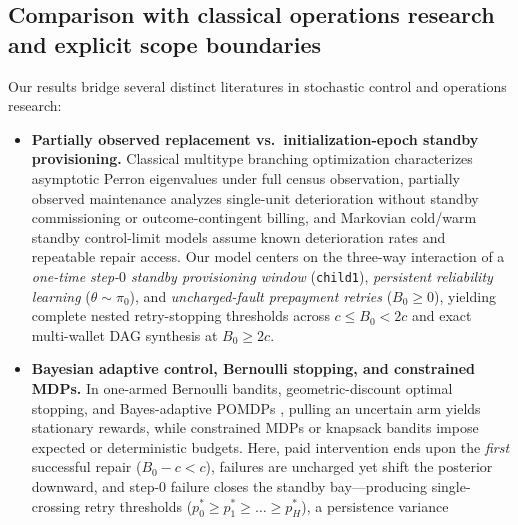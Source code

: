 \documentclass[11pt,letterpaper]{article}
\providecommand{\tightlist}{\setlength{\itemsep}{2pt}\setlength{\parskip}{0pt}}
\begin{document}
\subsection{Comparison with classical operations research and explicit
scope
boundaries}\label{comparison-with-classical-operations-research-and-explicit-scope-boundaries}

Our results bridge several distinct literatures in stochastic control
and operations research:

\begin{itemize}
\tightlist
\item
  \textbf{Partially observed replacement vs.~initialization-epoch
  standby provisioning.} Classical multitype branching optimization
  \citep{harris1963, sevastyanov1971, athreyaNey1972, pliska1976, rothblumWhittle1982, gonzalez2018}
  characterizes asymptotic Perron eigenvalues under full census
  observation, partially observed maintenance
  \citep{eckles1968, ross1971, barlowProschan1975, white1979, monahan1982, makisJiang2003}
  analyzes single-unit deterioration without standby commissioning or
  outcome-contingent billing, and Markovian cold/warm standby
  control-limit models \citep{barronYechiali2017} assume known
  deterioration rates and repeatable repair access. Our model centers on
  the three-way interaction of a \emph{one-time step-\(0\) standby
  provisioning window} (\texttt{child1}), \emph{persistent reliability
  learning} (\(\theta \sim \pi_0\)), and \emph{uncharged-fault
  prepayment retries} (\(B_0 \ge 0\)), yielding complete nested
  retry-stopping thresholds across \(c \le B_0 < 2c\) and exact
  multi-wallet DAG synthesis at \(B_0 \ge 2c\).
\item
  \textbf{Bayesian adaptive control, Bernoulli stopping, and constrained
  MDPs.} In one-armed Bernoulli bandits, geometric-discount optimal
  stopping, and Bayes-adaptive POMDPs
  \citep{robbins1952, bellman1961, rieder1975, gittins1979, berryFristedt1979, whittle1982, fristedtBerry1988, easleyKiefer1988, aghion1991, duff2002, ross2011},
  pulling an uncertain arm yields stationary rewards, while constrained
  MDPs
  \citep{altman1999, feinberg2000, bauerleRieder2011, mannorTsitsiklis2013}
  or knapsack bandits \citep{besbesZeevi2009, badanidiyuru2018} impose
  expected or deterministic budgets. Here, paid intervention ends upon
  the \emph{first} successful repair (\(B_0 - c < c\)), failures are
  uncharged yet shift the posterior downward, and step-\(0\) failure
  closes the standby bay---producing single-crossing retry thresholds
  (\(p_0^* \ge p_1^* \ge \dots \ge p_H^*\)), a persistence variance

\end{itemize}
\end{document}
